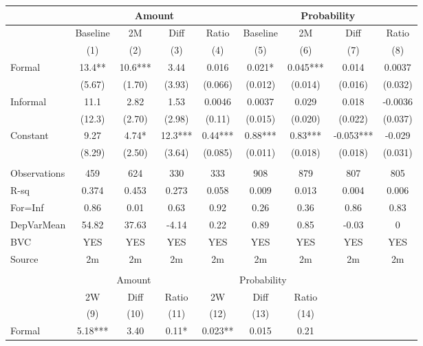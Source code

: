 \begin{tabular}{lcccccccc}
\toprule
      & \multicolumn{4}{c}{Amount}    & \multicolumn{4}{c}{Probability} \\
\midrule
\midrule
      & Baseline & 2M    & Diff  & Ratio & Baseline & 2M    & Diff  & Ratio \\
\midrule
      & (1)   & (2)   & (3)   & (4)   & (5)   & (6)   & (7)   & (8) \\
\midrule
\midrule
Formal & 13.4** & 10.6*** & 3.44  & 0.016 & 0.021* & 0.045*** & 0.014 & 0.0037 \\
      & (5.67) & (1.70) & (3.93) & (0.066) & (0.012) & (0.014) & (0.016) & (0.032) \\
Informal & 11.1  & 2.82  & 1.53  & 0.0046 & 0.0037 & 0.029 & 0.018 & -0.0036 \\
      & (12.3) & (2.70) & (2.98) & (0.11) & (0.015) & (0.020) & (0.022) & (0.037) \\
Constant & 9.27  & 4.74* & 12.3*** & 0.44*** & 0.88*** & 0.83*** & -0.053*** & -0.029 \\
      & (8.29) & (2.50) & (3.64) & (0.085) & (0.011) & (0.018) & (0.018) & (0.031) \\
      &       &       &       &       &       &       &       &  \\
\midrule
Observations & 459   & 624   & 330   & 333   & 908   & 879   & 807   & 805 \\
R-sq  & 0.374 & 0.453 & 0.273 & 0.058 & 0.009 & 0.013 & 0.004 & 0.006 \\
For=Inf & 0.86  & 0.01  & 0.63  & 0.92  & 0.26  & 0.36  & 0.86  & 0.83 \\
DepVarMean & 54.82 & 37.63 & -4.14 & 0.22  & 0.89  & 0.85  & -0.03 & 0 \\
BVC   & YES   & YES   & YES   & YES   & YES   & YES   & YES   & YES \\
Source & 2m    & 2m    & 2m    & 2m    & 2m    & 2m    & 2m    & 2m \\
\midrule
\midrule
      &       &       &       &       &       &       &       &  \\
\cmidrule{1-7}      & \multicolumn{3}{c}{Amount} & \multicolumn{3}{c}{Probability} &       &  \\
\cmidrule{1-7}      & 2W    & Diff  & Ratio & 2W    & Diff  & Ratio &       &  \\
\cmidrule{1-7}      & (9)   & (10)  & (11)  & (12)  & (13)  & (14)  &       &  \\
\cmidrule{1-7}Formal & 5.18*** & 3.40  & 0.11* & 0.023** & 0.015 & 0.21  &       &  \\

\end{tabular}
